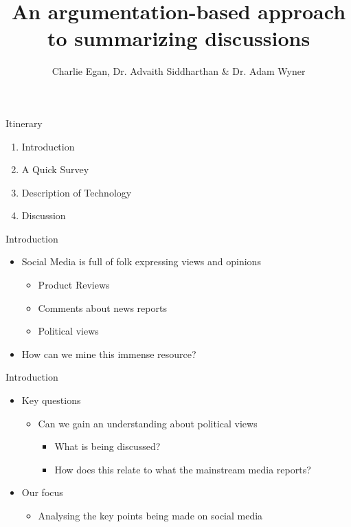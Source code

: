\documentclass{beamer}
\title{An argumentation-based approach to summarizing discussions}
\date{}
\author{Charlie Egan, Dr. Advaith Siddharthan \& Dr. Adam Wyner}
\institute{University of Aberdeen}
\begin{document}
  \maketitle
  \begin{frame}{Itinerary}
	\begin{enumerate}
	\item{Introduction}
	\item{A Quick Survey}
	\item{Description of Technology}
	\item{Discussion}
	\end{enumerate}
  \end{frame}


  \begin{frame}{Introduction}
	\begin{itemize}
	\item Social Media is full of folk expressing views and opinions
	  \begin{itemize}
	  \item Product Reviews
	  \item Comments about news reports
	  \item Political views
	  \end{itemize}
	\item How can we mine this immense resource?
	\end{itemize}
  \end{frame}

  \begin{frame}{Introduction}
	\begin{itemize}
	\item Key questions
	  \begin{itemize}
	  \item Can we gain an understanding about political views
		\begin{itemize}
		\item What is being discussed?
		\item How does this relate to what the mainstream media reports?
		\end{itemize}
	  \end{itemize}
	\item Our focus
	  \begin{itemize}
	  \item Analysing the key points being made on social media
	  \end{itemize}

	\end{itemize}
  \end{frame}
\end{document}
